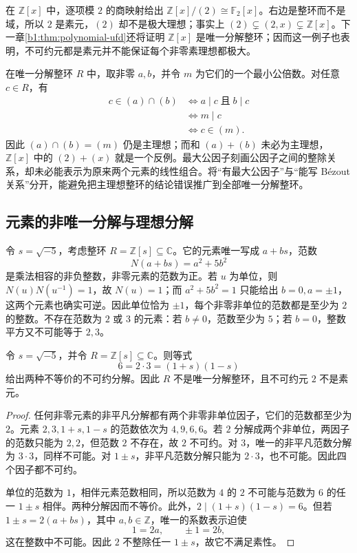 \ProseParagraphBreak
在 \(\mathbb Z[x]\) 中，逐项模 \(2\) 的商映射给出 \(\mathbb Z[x]/(2)\cong\mathbb F_2[x]\)。右边是整环而不是域，所以 \(2\) 是素元，\((2)\) 却不是极大理想；事实上 \((2)\subsetneq(2,x)\subsetneq\mathbb Z[x]\)。下一章\cref{b1:thm:polynomial-ufd}还将证明 \(\mathbb Z[x]\) 是唯一分解整环；因而这一例子也表明，不可约元都是素元并不能保证每个非零素理想都极大。

\ProseParagraphBreak
在唯一分解整环 \(R\) 中，取非零 \(a,b\)，并令 \(m\) 为它们的一个最小公倍数。对任意 \(c\in R\)，有
\[
	\begin{aligned}
		c\in(a)\cap(b) &\iff a\mid c\;\text{且}\;b\mid c\\
		&\iff m\mid c\\
		&\iff c\in(m).
	\end{aligned}
\]
因此 \((a)\cap(b)=(m)\) 仍是主理想；而和 \((a)+(b)\) 未必为主理想，\(\mathbb Z[x]\) 中的 \((2)+(x)\) 就是一个反例。最大公因子刻画公因子之间的整除关系，却未必能表示为原来两个元素的线性组合。将“有最大公因子”与“能写 Bézout 关系”分开，能避免把主理想整环的结论错误推广到全部唯一分解整环。

\subsection{元素的非唯一分解与理想分解}
\label{b1:subsec:1104:03}

令 \(s=\sqrt{-5}\)，考虑整环 \(R=\mathbb Z[s]\subseteq\mathbb C\)。它的元素唯一写成 \(a+bs\)，范数
\[
	N(a+bs)=a^2+5b^2
\]
是乘法相容的非负整数，非零元素的范数为正。若 \(u\) 为单位，则 \(N(u)N(u^{-1})=1\)，故 \(N(u)=1\)；而 \(a^2+5b^2=1\) 只能给出 \(b=0,a=\pm1\)，这两个元素也确实可逆。因此单位恰为 \(\pm1\)，每个非零非单位的范数都是至少为 \(2\) 的整数。不存在范数为 \(2\) 或 \(3\) 的元素：若 \(b\ne0\)，范数至少为 \(5\)；若 \(b=0\)，整数平方又不可能等于 \(2,3\)。

\begin{proposition}\label{b1:prop:sqrt-minus-five-factorization}
	令 \(s=\sqrt{-5}\)，并令 \(R=\mathbb Z[s]\subseteq\mathbb C\)。则等式
	\[
		6=2\cdot3=(1+s)(1-s)
	\]
	给出两种不等价的不可约分解。因此 \(R\) 不是唯一分解整环，且不可约元 \(2\) 不是素元。
\end{proposition}
\begin{proof}
	任何非零元素的非平凡分解都有两个非零非单位因子，它们的范数都至少为 \(2\)。元素 \(2,3,1+s,1-s\) 的范数依次为 \(4,9,6,6\)。若 \(2\) 分解成两个非单位，两因子的范数只能为 \(2,2\)，但范数 \(2\) 不存在，故 \(2\) 不可约。对 \(3\)，唯一的非平凡范数分解为 \(3\cdot3\)，同样不可能。对 \(1\pm s\)，非平凡范数分解只能为 \(2\cdot3\)，也不可能。因此四个因子都不可约。

	单位的范数为 \(1\)，相伴元素范数相同，所以范数为 \(4\) 的 \(2\) 不可能与范数为 \(6\) 的任一 \(1\pm s\) 相伴。两种分解因而不等价。此外，\(2\mid(1+s)(1-s)=6\)。但若 \(1\pm s=2(a+bs)\)，其中 \(a,b\in\mathbb Z\)，唯一的系数表示迫使
	\[
		1=2a,\qquad \pm1=2b,
	\]
	这在整数中不可能。因此 \(2\) 不整除任一 \(1\pm s\)，故它不满足素性。
\end{proof}

